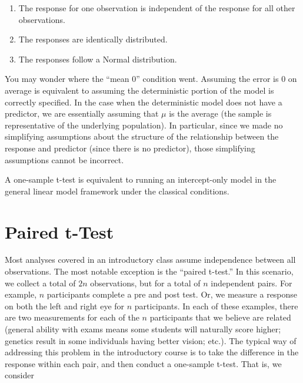 \documentclass[
  letterpaper,
  DIV=11,
  numbers=noendperiod]{scrreprt}
\providecommand{\tightlist}{%
  \setlength{\itemsep}{0pt}\setlength{\parskip}{0pt}}\usepackage{longtable,booktabs,array}
\theoremstyle{definition}
\theoremstyle{definition}
\theoremstyle{remark}
\begin{document}
\begin{enumerate}
\def\labelenumi{\arabic{enumi}.}
\tightlist
\item
  The response for one observation is independent of the response for
  all other observations.
\item
  The responses are identically distributed.
\item
  The responses follow a Normal distribution.
\end{enumerate}

You may wonder where the ``mean 0'' condition went. Assuming the error
is 0 on average is equivalent to assuming the deterministic portion of
the model is correctly specified. In the case when the deterministic
model does not have a predictor, we are essentially assuming that
\(\mu\) is the average (the sample is representative of the underlying
population). In particular, since we made no simplifying assumptions
about the structure of the relationship between the response and
predictor (since there is no predictor), those simplifying assumptions
cannot be incorrect.

\begin{tcolorbox}[enhanced jigsaw, left=2mm, toprule=.15mm, arc=.35mm, breakable, opacitybacktitle=0.6, opacityback=0, rightrule=.15mm, colbacktitle=quarto-callout-tip-color!10!white, coltitle=black, leftrule=.75mm, toptitle=1mm, colframe=quarto-callout-tip-color-frame, titlerule=0mm, title=\textcolor{quarto-callout-tip-color}{\faLightbulb}\hspace{0.5em}{Big Idea}, bottomrule=.15mm, colback=white, bottomtitle=1mm]

A one-sample t-test is equivalent to running an intercept-only model in
the general linear model framework under the classical conditions.

\end{tcolorbox}

\hypertarget{paired-t-test}{%
\section{Paired t-Test}\label{paired-t-test}}

Most analyses covered in an introductory class assume independence
between all observations. The most notable exception is the ``paired
t-test.'' In this scenario, we collect a total of \(2n\) observations,
but for a total of \(n\) independent pairs. For example, \(n\)
participants complete a pre and post test. Or, we measure a response on
both the left and right eye for \(n\) participants. In each of these
examples, there are two measurements for each of the \(n\) participants
that we believe are related (general ability with exams means some
students will naturally score higher; genetics result in some
individuals having better vision; etc.). The typical way of addressing
this problem in the introductory course is to take the difference in the
response within each pair, and then conduct a one-sample t-test. That
is, we consider
\end{document}
